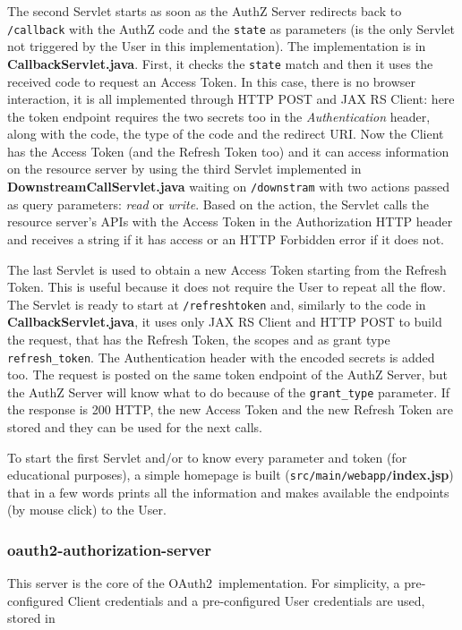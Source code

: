 \documentclass[a4paper,12pt]{article}
\def\oauth{OAuth2\xspace}
\begin{document}
The second Servlet starts as soon as the AuthZ Server redirects back to \texttt{/callback} with the AuthZ code and the \texttt{state} as parameters (is the only Servlet not triggered by the User in this implementation). The implementation is in \textbf{CallbackServlet.java}. First, it checks the \texttt{state} match and then it uses the received code to request an Access Token. In this case, there is no browser interaction, it is all implemented through HTTP POST and JAX RS Client: here the token endpoint requires the two secrets too in the \textit{Authentication} header, along with the code, the type of the code and the redirect URI. Now the Client has the Access Token (and the Refresh Token too) and it can access information on the resource server by using the third Servlet implemented in \textbf{DownstreamCallServlet.java} waiting on \texttt{/downstram} with two actions passed as query parameters: \textit{read} or \textit{write}. Based on the action, the Servlet calls the resource server's APIs with the Access Token in the Authorization HTTP header and receives a string if it has access or an HTTP Forbidden error if it does not.

The last Servlet is used to obtain a new Access Token starting from the Refresh Token. This is useful because it does not require the User to repeat all the flow. The Servlet is ready to start at \texttt{/refreshtoken} and, similarly to the code in \textbf{CallbackServlet.java}, it uses only JAX RS Client and HTTP POST to build the request, that has the Refresh Token, the scopes and as grant type \texttt{refresh\_token}. The Authentication header with the encoded secrets is added too. The request is posted on the same token endpoint of the AuthZ Server, but the AuthZ Server will know what to do because of the \texttt{grant\_type} parameter. If the response is 200 HTTP, the new Access Token and the new Refresh Token are stored and they can be used for the next calls.

To start the first Servlet and/or to know every parameter and token (for educational purposes), a simple homepage is built (\texttt{src/main/webapp/}\textbf{index.jsp}) that in a few words prints all the information and makes available the endpoints (by mouse click) to the User.

\subsubsection{oauth2-authorization-server}
This server is the core of the \oauth\ implementation. For simplicity, a pre-configured Client credentials and a pre-configured User credentials are used, stored in
\end{document}
